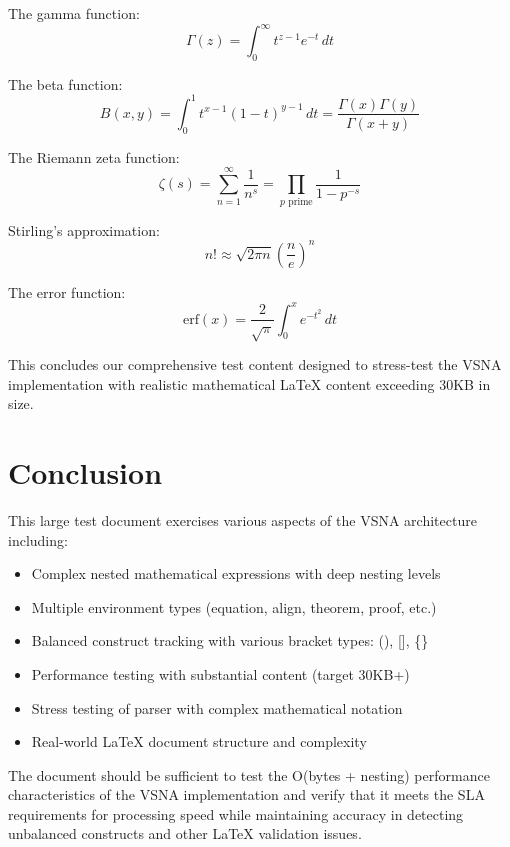 \documentclass[12pt]{article}
\begin{document}
The gamma function:
\begin{equation}
\Gamma(z) = \int_0^{\infty} t^{z-1} e^{-t} \, dt
\end{equation}

The beta function:
\begin{equation}
B(x,y) = \int_0^1 t^{x-1} (1-t)^{y-1} \, dt = \frac{\Gamma(x)\Gamma(y)}{\Gamma(x+y)}
\end{equation}

The Riemann zeta function:
\begin{equation}
\zeta(s) = \sum_{n=1}^{\infty} \frac{1}{n^s} = \prod_{p \text{ prime}} \frac{1}{1-p^{-s}}
\end{equation}

Stirling's approximation:
\begin{equation}
n! \approx \sqrt{2\pi n} \left(\frac{n}{e}\right)^n
\end{equation}

The error function:
\begin{equation}
\text{erf}(x) = \frac{2}{\sqrt{\pi}} \int_0^x e^{-t^2} \, dt
\end{equation}

This concludes our comprehensive test content designed to stress-test the VSNA implementation with realistic mathematical LaTeX content exceeding 30KB in size.

\section{Conclusion}

This large test document exercises various aspects of the VSNA architecture including:
\begin{itemize}
\item Complex nested mathematical expressions with deep nesting levels
\item Multiple environment types (equation, align, theorem, proof, etc.)
\item Balanced construct tracking with various bracket types: (), [], \{\}
\item Performance testing with substantial content (target 30KB+)
\item Stress testing of parser with complex mathematical notation
\item Real-world LaTeX document structure and complexity
\end{itemize}

The document should be sufficient to test the O(bytes + nesting) performance characteristics of the VSNA implementation and verify that it meets the SLA requirements for processing speed while maintaining accuracy in detecting unbalanced constructs and other LaTeX validation issues.
\end{document}
